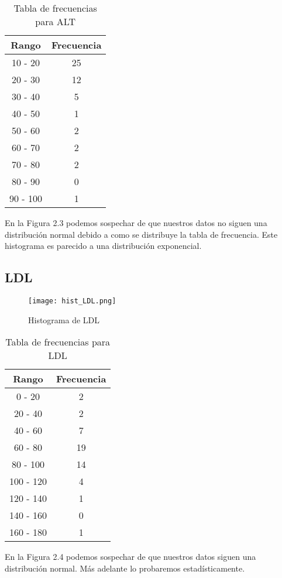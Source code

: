 \documentclass[12pt]{report}
\begin{document}
\begin{table}[H]
    \centering
    \begin{tabular}{|c|c|}
        \hline
        \textbf{Rango} & \textbf{Frecuencia} \\
        \hline
        10 - 20 & 25 \\
        20 - 30 & 12 \\
        30 - 40 & 5 \\
        40 - 50 & 1 \\
        50 - 60 & 2 \\
        60 - 70 & 2 \\
        70 - 80 & 2 \\
        80 - 90 & 0 \\
        90 - 100 & 1 \\
        \hline
    \end{tabular}
    \caption{Tabla de frecuencias para ALT}
\end{table}
\noindent En la Figura 2.3 podemos sospechar de que nuestros datos no siguen una distribución normal debido a como se distribuye la tabla de frecuencia. Este histograma es parecido a una distribución exponencial.

\subsection{LDL}
\begin{figure}[H]
    \centering
    \texttt{[image: hist\_LDL.png]}
    \caption{Histograma de LDL}
\end{figure}

\begin{table}[H]
    \centering
    \begin{tabular}{|c|c|}
        \hline
        \textbf{Rango} & \textbf{Frecuencia} \\
        \hline
        0 - 20 & 2 \\
        20 - 40 & 2 \\
        40 - 60 & 7 \\
        60 - 80 & 19 \\
        80 - 100 & 14 \\
        100 - 120 & 4 \\
        120 - 140 & 1 \\
        140 - 160 & 0 \\
        160 - 180 & 1 \\
        \hline
    \end{tabular}
    \caption{Tabla de frecuencias para LDL}
\end{table}
\noindent En la Figura 2.4 podemos sospechar de que nuestros datos siguen una distribución normal. Más adelante lo probaremos estadísticamente.
\end{document}

